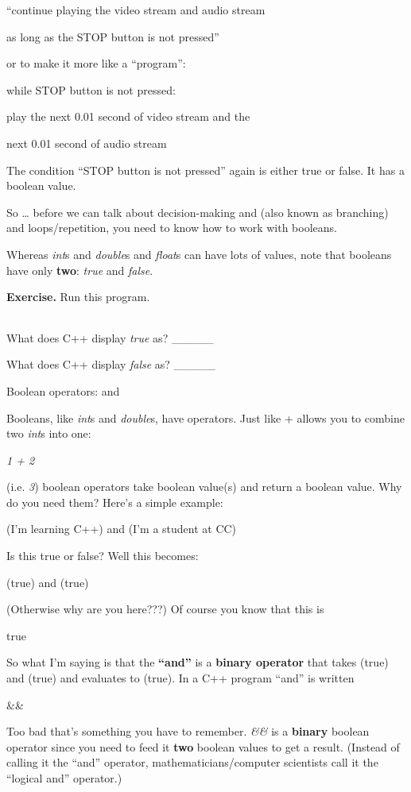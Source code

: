 \documentclass[
]{article}
\begin{document}
``continue playing the video stream and audio stream

as long as the STOP button is not pressed''

or to make it more like a ``program'':

while STOP button is not pressed:

play the next 0.01 second of video stream and the

next 0.01 second of audio stream

The condition ``STOP button is not pressed'' again is either true or
false. It has a boolean value.

So \ldots{} before we can talk about decision-making and (also known as
branching) and loops/repetition, you need to know how to work with
booleans.

Whereas \emph{int}s and \emph{double}s and \emph{float}s can have lots
of values, note that booleans have only \textbf{two}: \emph{true} and
\emph{false}.

\textbf{Exercise.} Run this program.

\begin{longtable}[]{@{}@{}}
\toprule
\endhead
\bottomrule
\end{longtable}

What does C++ display \emph{true} as? \_\_\_\_\_

What does C++ display \emph{false} as? \_\_\_\_\_

Boolean operators: and

Booleans, like \emph{int}s and \emph{double}s, have operators. Just like
+ allows you to combine two \emph{int}s into one:

\emph{1 + 2}

(i.e. \emph{3}) boolean operators take boolean value(s) and return a
boolean value. Why do you need them? Here's a simple example:

(I'm learning C++) and (I'm a student at CC)

Is this true or false? Well this becomes:

(true) and (true)

(Otherwise why are you here???) Of course you know that this is

true

So what I'm saying is that the \textbf{``and''} is a \textbf{binary
operator} that takes (true) and (true) and evaluates to (true). In a C++
program ``and'' is written

\&\&

Too bad that's something you have to remember. \emph{\&\&} is a
\textbf{binary} boolean operator since you need to feed it \textbf{two}
boolean values to get a result. (Instead of calling it the ``and''
operator, mathematicians/computer scientists call it the ``logical and''
operator.)
\end{document}
